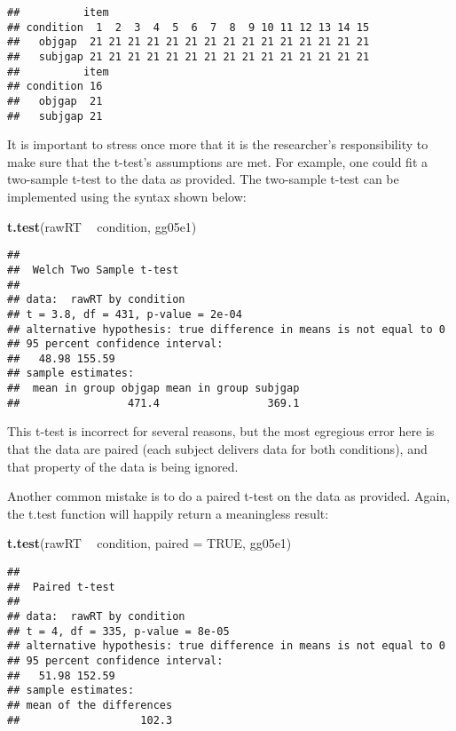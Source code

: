 \documentclass[12pt,]{krantz}
\newenvironment{Shaded}{\begin{snugshade}}{\end{snugshade}}
\newcommand{\DataTypeTok}[1]{\textcolor[rgb]{0.13,0.29,0.53}{#1}}
\newcommand{\KeywordTok}[1]{\textcolor[rgb]{0.13,0.29,0.53}{\textbf{#1}}}
\newcommand{\NormalTok}[1]{#1}
\newcommand{\OperatorTok}[1]{\textcolor[rgb]{0.81,0.36,0.00}{\textbf{#1}}}
\newcommand{\OtherTok}[1]{\textcolor[rgb]{0.56,0.35,0.01}{#1}}
\newcommand{\StringTok}[1]{\textcolor[rgb]{0.31,0.60,0.02}{#1}}
\begin{document}
\begin{verbatim}
##          item
## condition  1  2  3  4  5  6  7  8  9 10 11 12 13 14 15
##   objgap  21 21 21 21 21 21 21 21 21 21 21 21 21 21 21
##   subjgap 21 21 21 21 21 21 21 21 21 21 21 21 21 21 21
##          item
## condition 16
##   objgap  21
##   subjgap 21
\end{verbatim}

It is important to stress once more that it is the researcher's responsibility to make sure that the t-test's assumptions are met. For example, one could fit a two-sample t-test to the data as provided. The two-sample t-test can be implemented using the syntax shown below:

\begin{Shaded}
\begin{Highlighting}[]
\KeywordTok{t.test}\NormalTok{(rawRT }\OperatorTok{~}\StringTok{ }\NormalTok{condition, gg05e1)}
\end{Highlighting}
\end{Shaded}

\begin{verbatim}
## 
## 	Welch Two Sample t-test
## 
## data:  rawRT by condition
## t = 3.8, df = 431, p-value = 2e-04
## alternative hypothesis: true difference in means is not equal to 0
## 95 percent confidence interval:
##   48.98 155.59
## sample estimates:
##  mean in group objgap mean in group subjgap 
##                 471.4                 369.1
\end{verbatim}

This t-test is incorrect for several reasons, but the most egregious error here is that the data are paired (each subject delivers data for both conditions), and that property of the data is being ignored.

Another common mistake is to do a paired t-test on the data as provided. Again, the t.test function will happily return a meaningless result:

\begin{Shaded}
\begin{Highlighting}[]
\KeywordTok{t.test}\NormalTok{(rawRT }\OperatorTok{~}\StringTok{ }\NormalTok{condition, }\DataTypeTok{paired =} \OtherTok{TRUE}\NormalTok{, }
\NormalTok{  gg05e1)}
\end{Highlighting}
\end{Shaded}

\begin{verbatim}
## 
## 	Paired t-test
## 
## data:  rawRT by condition
## t = 4, df = 335, p-value = 8e-05
## alternative hypothesis: true difference in means is not equal to 0
## 95 percent confidence interval:
##   51.98 152.59
## sample estimates:
## mean of the differences 
##                   102.3
\end{verbatim}
\end{document}
